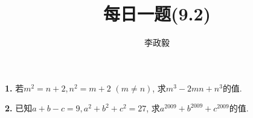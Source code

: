 \documentclass{article}
\title{每日一题(9.2)}
\author{\kaishu 李政毅}
\begin{document}
\maketitle
\textbf{1. }若$m^2=n+2, n^2=m+2$ $(m\neq n)$, 求$m^3-2mn+n^3$的值.\\\par
\textbf{2. }已知$a+b-c=9, a^2+b^2+c^2=27$, 求$a^{2009}+b^{2009}+c^{2009}$的值. 
\end{document}
